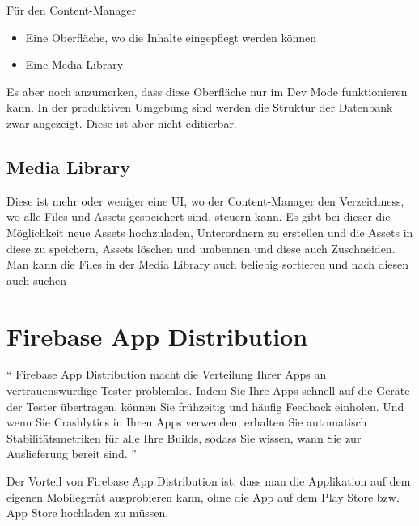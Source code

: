 Für den Content-Manager
\begin{itemize}
  \item Eine Oberfläche, wo die Inhalte eingepflegt werden können
  \item Eine Media Library
\end{itemize}

Es aber noch anzumerken, dass diese Oberfläche nur im Dev Mode funktionieren kann. In der produktiven Umgebung sind werden die Struktur der Datenbank zwar angezeigt. Diese ist aber nicht editierbar.


\subsection{Media Library}

Diese ist mehr oder weniger eine UI, wo der Content-Manager den Verzeichness, wo alle Files und Assets gespeichert sind, steuern kann.
Es gibt bei dieser die Möglichkeit neue Assets hochzuladen, Unterordnern zu erstellen und die Assets in diese zu speichern, Assets löschen und umbennen und diese auch Zuschneiden.
Man kann die Files in der Media Library auch beliebig sortieren und nach diesen auch suchen
\cite{media-library}




\section{Firebase App Distribution}

``
Firebase App Distribution macht die Verteilung
Ihrer Apps an vertrauenswürdige Tester problemlos. Indem Sie Ihre Apps schnell
auf die Geräte der Tester übertragen, können Sie frühzeitig und häufig
Feedback einholen.
Und wenn Sie Crashlytics in Ihren Apps verwenden, erhalten Sie automatisch Stabilitätsmetriken für alle Ihre Builds, sodass Sie wissen, wann Sie zur Auslieferung bereit sind.
''\cite{fire-base-app-distribution}

Der Vorteil von Firebase App Distribution ist,
dass man die Applikation auf dem eigenen Mobilegerät ausprobieren kann,
ohne die App auf dem Play Store bzw. App Store hochladen zu müssen.
